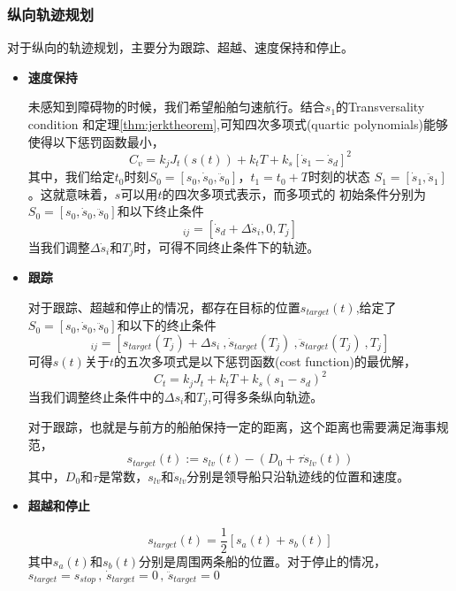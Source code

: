 \subsubsection{纵向轨迹规划}
对于纵向的轨迹规划，主要分为跟踪、超越、速度保持和停止。
\begin{itemize}
  \item \textbf{速度保持}

  未感知到障碍物的时候，我们希望船舶匀速航行。结合$s_1$的Transversality condition
  \cite{IROS637936}和定理\ref{thm:jerktheorem},可知四次多项式(quartic polynomials)能够
  使得以下惩罚函数最小，
  \begin{equation}
    C_v = k_j J_t(s(t)) + k_t T + k_{\dot{s}}[\dot{s}_1-\dot{s}_d]^2
  \end{equation}
  其中，我们给定$t_0$时刻$S_0=[s_0, \dot{s}_0, \ddot{s}_0]$，$t_1=t_0+T$时刻的状态
  $S_1=[\dot{s}_1,\ddot{s}_1]$。这就意味着，$s$可以用$t$的四次多项式表示，而多项式的
  初始条件分别为$S_0=[s_0, \dot{s}_0, \ddot{s}_0]$和以下终止条件
  \begin{equation}
    [\dot{s}_1, \ddot{s}_1, T]_{ij}= [\dot{s}_d+\Delta \dot{s}_i, 0, T_j]
  \end{equation}
  当我们调整$\Delta \dot{s}_i$和$T_j$时，可得不同终止条件下的轨迹。
  \item \textbf{跟踪}

  对于跟踪、超越和停止的情况，都存在目标的位置$s_{target}(t)$,给定了$S_0 = [s_0,
  \dot{s}_0, \ddot{s}_0]$和以下的终止条件
  \begin{equation}
    [s_1, \dot{s}_1,\ddot{s}_1, T]_{ij}=[s_{target}(T_j)+\Delta s_i \: ,
    \dot{s}_{target}(T_j) \: , \ddot{s}_{target}(T_j) \: , T_j]
  \end{equation}
  可得$s(t)$关于$t$的五次多项式是以下惩罚函数(cost function)的最优解，
  \begin{equation}
    C_t = k_j J_t + k_t T + k_s(s_1-s_d)^2
  \end{equation}
  当我们调整终止条件中的$\Delta s_i$和$T_j$,可得多条纵向轨迹。

  对于跟踪，也就是与前方的船舶保持一定的距离，这个距离也需要满足海事规范，
  \begin{equation}
    s_{target}(t):=s_{lv}(t)-(D_0+\tau \dot{s}_{lv}(t))
  \end{equation}
  其中，$D_0$和$\tau$是常数，$s_{lv}$和$\dot{s}_{lv}$分别是领导船只沿轨迹线的位置和速度。
  \item \textbf{超越和停止}

  \begin{equation}
    s_{target}(t)=\frac{1}{2}[s_a(t)+s_b(t)]
  \end{equation}
  其中$s_a(t)$和$s_b(t)$分别是周围两条船的位置。对于停止的情况，
  $s_{target}=s_{stop} \, , \, \dot{s}_{target}=0 \, , \, \ddot{s}_{target}=0$
\end{itemize}

